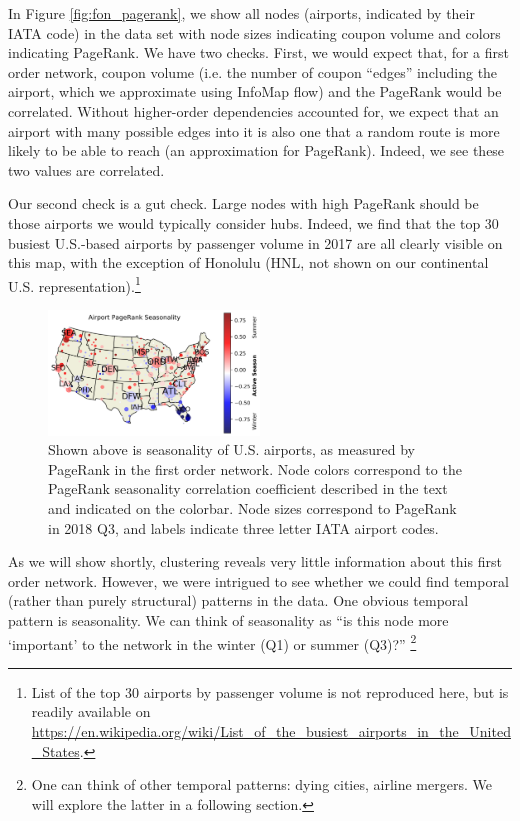 \documentclass[sigconf]{acmart}
\begin{document}
In Figure \ref{fig:fon_pagerank}, we show all nodes (airports, indicated by their IATA code) in the data set with node sizes indicating coupon volume and colors indicating PageRank. We have two checks. First, we would expect that, for a first order network, coupon volume (i.e. the number of coupon ``edges'' including the airport, which we approximate using InfoMap flow) and the PageRank would be correlated. Without higher-order dependencies accounted for, we expect that an airport with many possible edges into it is also one that a random route is more likely to be able to reach (an approximation for PageRank). Indeed, we see these two values are correlated.

Our second check is a gut check. Large nodes with high PageRank should be those airports we would typically consider hubs. Indeed, we find that the top 30 busiest U.S.-based airports by passenger volume in 2017 are all clearly visible on this map, with the exception of Honolulu (HNL, not shown on our continental U.S. representation).\footnote{List of the top 30 airports by passenger volume is not reproduced here, but is readily available on \url{https://en.wikipedia.org/wiki/List_of_the_busiest_airports_in_the_United_States}.}  

\begin{figure}
    \centering
    \includegraphics[width=0.5\textwidth]{figs/seasonality_map.png}
    \caption{Shown above is seasonality of U.S. airports, as measured by PageRank in the first order network. Node colors correspond to the PageRank seasonality correlation coefficient described in the text and indicated on the colorbar. Node sizes correspond to PageRank in 2018 Q3, and labels indicate three letter IATA airport codes.}
    \label{fig:seasonality}
\end{figure}

As we will show shortly, clustering reveals very little information about this first order network. However, we were intrigued to see whether we could find temporal (rather than purely structural) patterns in the data. One obvious temporal pattern is seasonality. We can think of seasonality as ``is this node more `important' to the network in the winter (Q1) or summer (Q3)?'' \footnote{One can think of other temporal patterns: dying cities, airline mergers. We will explore the latter in a following section.}
\end{document}
